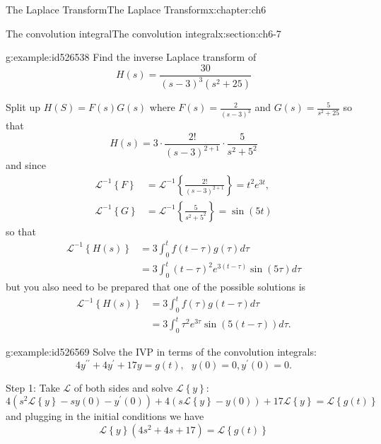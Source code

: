 \documentclass[oneside,10pt,]{book}
\numberwithin{equation}{section}
\numberwithin{equation}{section}
\newcommand{\amp}{&}
\begin{document}
\begin{chapterptx}{The Laplace Transform}{}{The Laplace Transform}{}{}{x:chapter:ch6}
\begin{sectionptx}{The convolution integral}{}{The convolution integral}{}{}{x:section:ch6-7}
\begin{example}{}{g:example:id526538}%
Find the inverse Laplace transform of%
\begin{equation*}
H(s)=\frac{30}{\left(s-3\right)^{3}(s^{2}+25)}
\end{equation*}
%
\par
Split up \(H(S)=F(s)G(s)\) where \(F(s)=\frac{2}{(s-3)^{3}}\) and \(G(s)=\frac{5}{s^{2}+25}\) so that%
\begin{equation*}
H(s)=3\cdot\frac{2!}{(s-3)^{2+1}}\cdot\frac{5}{s^{2}+5^{2}}
\end{equation*}
and since%
\begin{align*}
\mathcal{L}^{-1}\left\{ F\right\}  \amp =\mathcal{L}^{-1}\left\{ \frac{2!}{(s-3)^{2+1}}\right\} =t^{2}e^{3t},\\
\mathcal{L}^{-1}\left\{ G\right\}  \amp =\mathcal{L}^{-1}\left\{ \frac{5}{s^{2}+5^{2}}\right\} =\sin\left(5t\right)
\end{align*}
so that%
\begin{align*}
\mathcal{L}^{-1}\left\{ H(s)\right\}  \amp =3\int_{0}^{t}f(t-\tau)g(\tau)d\tau\\
\amp =3\int_{0}^{t}(t-\tau)^{2}e^{3(t-\tau)}\sin\left(5\tau\right)d\tau
\end{align*}
but you also need to be prepared that one of the possible solutions is%
\begin{align*}
\mathcal{L}^{-1}\left\{ H(s)\right\}  \amp =3\int_{0}^{t}f(\tau)g(t-\tau)d\tau\\
\amp =3\int_{0}^{t}\tau^{2}e^{3\tau}\sin\left(5\left(t-\tau\right)\right)d\tau.
\end{align*}
%
\end{example}
\begin{example}{}{g:example:id526569}%
Solve the IVP in terms of the convolution integrals:%
\begin{equation*}
4y^{\prime\prime}+4y^{\prime}+17y=g(t),\,\,\,\,y(0)=0,y^{\prime}(0)=0.
\end{equation*}
%
\par
Step 1: Take \(\mathcal{L}\) of both sides and solve \(\mathcal{L}\left\{ y\right\} \):%
\begin{equation*}
4\left(s^{2}\mathcal{L}\left\{ y\right\} -sy(0)-y^{\prime}(0)\right)+4\left(s\mathcal{L}\left\{ y\right\} -y(0)\right)+17\mathcal{L}\left\{ y\right\} =\mathcal{L}\left\{ g(t)\right\} 
\end{equation*}
and plugging in the initial conditions we have%
\begin{equation*}
\mathcal{L}\left\{ y\right\} \left(4s^{2}+4s+17\right)=\mathcal{L}\left\{ g(t)\right\} 

\end{equation*}
\end{example}
\end{sectionptx}
\end{chapterptx}
\end{document}
